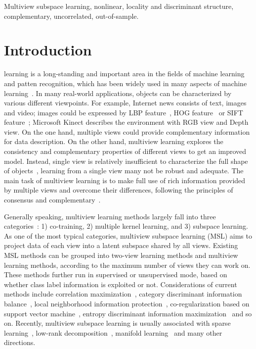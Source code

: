 \documentclass[journal]{IEEEtran}
\begin{document}
\begin{IEEEkeywords}
Multiview subspace learning, nonlinear, locality and discriminant structure, complementary, uncorrelated, out-of-sample. 
\end{IEEEkeywords}


\IEEEpeerreviewmaketitle



\section{Introduction}

 learning is a long-standing and important area in the fields of machine learning and patten recognition, which has been widely used in many aspects of machine learning~\cite{app1,app2,app3,app4,app5,app6}. 
In many real-world applications, objects can be characterized by various different viewpoints. 
For example, Internet news consists of text, images and video; images could be expressed by LBP feature~\cite{LBP}, HOG feature~\cite{HOG} or SIFT feature~\cite{SIFT}; Microsoft Kinect describes the environment with RGB view and Depth view. 
On the one hand, multiple views could provide complementary information for data description. 
On the other hand, multiview learning explores the consistency and complementary properties of different views to get an improved model. 
Instead, single view is relatively insufficient to characterize the full shape of objects~\cite{singleview}, learning from a single view many not be robust and adequate. 
The main task of multiview learning is to make full use of rich information provided by multiple views and overcome their differences, following the principles of consensus and complementary~\cite{tao_survey}. 

Generally speaking, multiview learning methods largely fall into three categories~\cite{tao_survey}: 1) co-training, 2) multiple kernel learning, and 3) subspace learning. 
As one of the most typical categories, multiview subspace learning (MSL) aims to project data of each view into a latent subspace shared by all views. 
Existing MSL methods can be grouped into two-view learning methods and multiview learning methods, according to the maximum number of views they can work on. 
These methods further run in supervised or unsupervised mode, based on whether class label information is exploited or not. 
Considerations of current methods include correlation maximization~\cite{CCA,2D-CCA,KCCA,MCCA}, category discriminant information balance~\cite{CDA,DCCA,MvDA}, local neighborhood information protection~\cite{LapMCCA,MSE,MVLPP}, co-regularization based on support vector machine~\cite{SVM-2K,MLSVM,MvTSVMs}, entropy discriminant information maximization~\cite{MvMED,MED-2C,AMMED} and so on. 
Recently, multiview subspace learning is usually associated with sparse learning~\cite{Sparse-CCA}, low-rank decomposition~\cite{xiangzhu}, manifold learning~\cite{MvML} and many other directions. 
\end{document}
